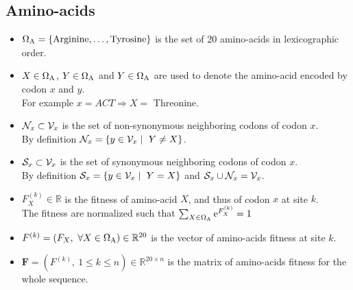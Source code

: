 \subsection{Amino-acids}
\begin{itemize}
	\item $\Omega_{\mathrm{A}} = \left\{ \mathrm{Arginine}, \dots ,\mathrm{Tyrosine} \right\} $ is the set of 20 amino-acids in lexicographic order.
	\item $X \in \Omega_{\mathrm{A}} $, $Y \in \Omega_{\mathrm{A}}$ and $Y \in \Omega_{\mathrm{A}}$ are used to denote the amino-acid encoded by \gls{codon} $x$ and $y$.
	\\For example $x=ACT \Rightarrow X=$ Threonine.
	\item $\mathcal{N}_x \subset \mathcal{V}_x $ is the set of non-synonymous neighboring \glspl{codon} of \gls{codon} $x$.
	\\By definition $\mathcal{N}_x = \left\{ y \in \mathcal{V}_x  \mid \ Y \neq X  \right\} $.
	\item $\mathcal{S}_x \subset \mathcal{V}_x $ is the set of synonymous neighboring \glspl{codon} of \gls{codon} $x$.
	\\By definition $\mathcal{S}_x = \left\{ y \in \mathcal{V}_x \mid \ Y = X  \right\} $ and $\mathcal{S}_x \cup \mathcal{N}_x = \mathcal{V}_x $.
	\item $F_X^{(k)} \in \mathbb{R} $ is the fitness of amino-acid $X$, and thus of \gls{codon} $x$ at site $k$.\\
	The fitness are normalized such that $\sum_{X \in \Omega_{\mathrm{A}}}\mathrm{e}^{F_X^{(k)}} = 1 $
	\item $F^{(k)} = \left( F_X , \ \forall X \in \Omega_{\mathrm{A}} \right) \in \mathbb{R}^{20} $ is the vector of amino-acids fitness at site $k$.
	\item $\bm{F} = \left( F^{(k)} , \  1 \leq k \leq n \right) \in \mathbb{R}^{20 \times n} $ is the matrix of amino-acids fitness for the whole sequence.
\end{itemize}

